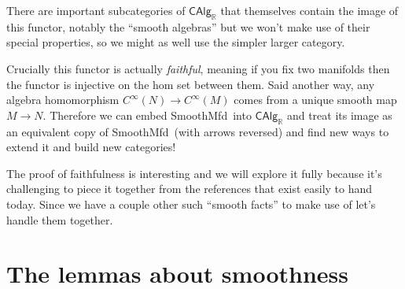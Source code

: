 \documentclass[12pt]{article}
\newcommand{\rr}{\ensuremath{\mathbb{R}}}
\newcommand{\cinfty}{\ensuremath{C^{\infty}}}
\newcommand{\smfd}{\textsf{SmoothMfd}}
\newcommand{\calg}{\textsf{CAlg}_{\rr}}
\begin{document}
There are important subcategories of $\calg$ that themselves contain the image of this functor, notably the ``smooth algebras'' but we won't make use of their special properties, so we might as well use the simpler larger category.

Crucially this functor is actually \emph{faithful}, meaning if you fix two manifolds then the functor is injective on the hom set between them. Said another way, any algebra homomorphism $\cinfty(N)\to\cinfty(M)$ comes from a unique smooth map $M\to N$. Therefore we can embed \smfd\ into $\calg$ and treat its image as an equivalent copy of \smfd\ (with arrows reversed) and find new ways to extend it and build new categories!

The proof of faithfulness is interesting and we will explore it fully because it's challenging to piece it together from the references that exist easily to hand today. Since we have a couple other such ``smooth facts'' to make use of let's handle them together.

\section{The lemmas about smoothness}\label{sec:smoothnesslemmas}
\end{document}
